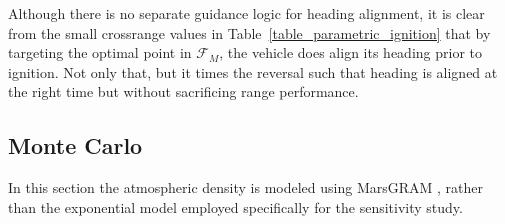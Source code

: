 \documentclass[letterpaper, preprint, paper,11pt]{AAS}
\begin{document}
Although there is no separate guidance logic for heading alignment, it is clear from the small crossrange values in Table~\ref{table_parametric_ignition} that by targeting the optimal point in $\mathcal{F}_M$, the vehicle does align its heading prior to ignition. Not only that, but it times the reversal such that heading is aligned at the right time but without sacrificing range performance. 


%
%

\subsection{Monte Carlo}
In this section the atmospheric density is modeled using MarsGRAM \cite{MarsGRAM2010}, rather than the exponential model employed specifically for the sensitivity study. 
\end{document}
